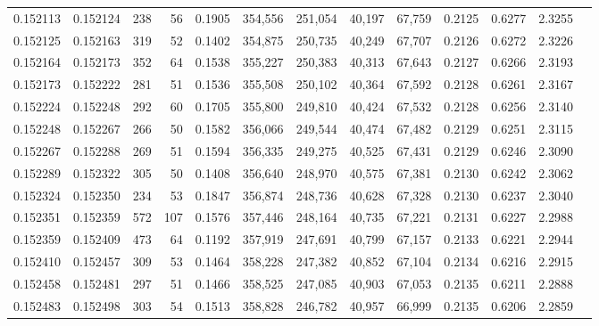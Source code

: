 \begin{tabular}{rrrrrrrrrrrrr}
0.152113 & 0.152124 &   238 &  56 &                                     0.1905 & 354,556 & 251,054 &  40,197 &  67,759 & 0.2125 & 0.6277 & 2.3255 \\
0.152125 & 0.152163 &   319 &  52 &                                     0.1402 & 354,875 & 250,735 &  40,249 &  67,707 & 0.2126 & 0.6272 & 2.3226 \\
0.152164 & 0.152173 &   352 &  64 &                                     0.1538 & 355,227 & 250,383 &  40,313 &  67,643 & 0.2127 & 0.6266 & 2.3193 \\
0.152173 & 0.152222 &   281 &  51 &                                     0.1536 & 355,508 & 250,102 &  40,364 &  67,592 & 0.2128 & 0.6261 & 2.3167 \\
0.152224 & 0.152248 &   292 &  60 &                                     0.1705 & 355,800 & 249,810 &  40,424 &  67,532 & 0.2128 & 0.6256 & 2.3140 \\
0.152248 & 0.152267 &   266 &  50 &                                     0.1582 & 356,066 & 249,544 &  40,474 &  67,482 & 0.2129 & 0.6251 & 2.3115 \\
0.152267 & 0.152288 &   269 &  51 &                                     0.1594 & 356,335 & 249,275 &  40,525 &  67,431 & 0.2129 & 0.6246 & 2.3090 \\
0.152289 & 0.152322 &   305 &  50 &                                     0.1408 & 356,640 & 248,970 &  40,575 &  67,381 & 0.2130 & 0.6242 & 2.3062 \\
0.152324 & 0.152350 &   234 &  53 &                                     0.1847 & 356,874 & 248,736 &  40,628 &  67,328 & 0.2130 & 0.6237 & 2.3040 \\
0.152351 & 0.152359 &   572 & 107 &                                     0.1576 & 357,446 & 248,164 &  40,735 &  67,221 & 0.2131 & 0.6227 & 2.2988 \\
0.152359 & 0.152409 &   473 &  64 &                                     0.1192 & 357,919 & 247,691 &  40,799 &  67,157 & 0.2133 & 0.6221 & 2.2944 \\
0.152410 & 0.152457 &   309 &  53 &                                     0.1464 & 358,228 & 247,382 &  40,852 &  67,104 & 0.2134 & 0.6216 & 2.2915 \\
0.152458 & 0.152481 &   297 &  51 &                                     0.1466 & 358,525 & 247,085 &  40,903 &  67,053 & 0.2135 & 0.6211 & 2.2888 \\
0.152483 & 0.152498 &   303 &  54 &                                     0.1513 & 358,828 & 246,782 &  40,957 &  66,999 & 0.2135 & 0.6206 & 2.2859 \\

\end{tabular}
